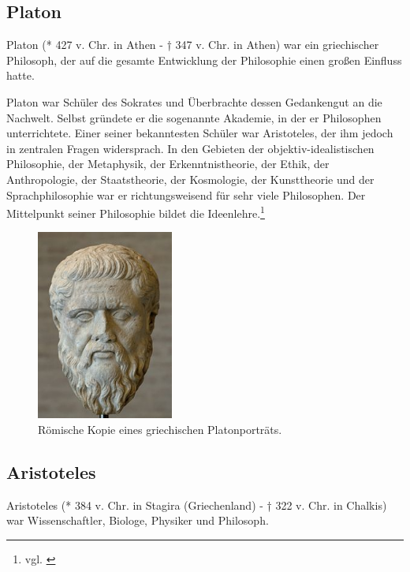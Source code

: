 \subsection{Platon}
Platon (* 427 v.  Chr. in Athen - † 347 v. Chr. in Athen) war ein griechischer Philosoph, der auf die gesamte Entwicklung der Philosophie einen großen Einfluss hatte. 

Platon war Schüler des Sokrates und Überbrachte dessen Gedankengut an die Nachwelt. Selbst gründete er die sogenannte Akademie, in der er Philosophen unterrichtete. Einer seiner bekanntesten Schüler war Aristoteles, der ihm jedoch in zentralen Fragen widersprach. In den Gebieten der objektiv-idealistischen Philosophie, der Metaphysik, der Erkenntnistheorie, der Ethik, der Anthropologie, der Staatstheorie, der Kosmologie, der Kunsttheorie und der Sprachphilosophie war er richtungsweisend für sehr viele Philosophen. Der Mittelpunkt seiner Philosophie bildet die Ideenlehre.\footnote{vgl. \cite{Platon1} \cite{Platon2}}

\begin{figure}[H]
	\centering 
	\includegraphics[width=0.4\textwidth]{Bilder/kap3/platon} 
	\caption{Römische Kopie eines griechischen Platonporträts.\cite{WikiPL}  \label{portraitPlaton}}
\end{figure}

\subsection{Aristoteles}
Aristoteles (* 384 v. Chr. in Stagira (Griechenland) - † 322 v. Chr. in Chalkis) war Wissenschaftler, Biologe, Physiker und Philosoph. 

